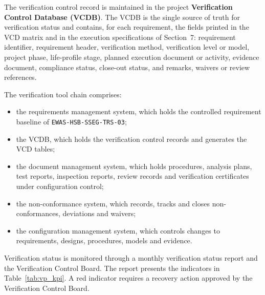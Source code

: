 The verification control record is maintained in the project \textbf{Verification Control Database (VCDB)}. The VCDB is the single source of truth for verification status and contains, for each requirement, the fields printed in the VCD matrix and in the execution specifications of Section~7: requirement identifier, requirement header, verification method, verification level or model, project phase, life-profile stage, planned execution document or activity, evidence document, compliance status, close-out status, and remarks, waivers or review references.

The verification tool chain comprises:
\begin{itemize}
    \item the requirements management system, which holds the controlled requirement baseline of \texttt{EWAS-HSB-SSEG-TRS-03};
    \item the VCDB, which holds the verification control records and generates the VCD tables;
    \item the document management system, which holds procedures, analysis plans, test reports, inspection reports, review records and verification certificates under configuration control;
    \item the non-conformance system, which records, tracks and closes non-conformances, deviations and waivers;
    \item the configuration management system, which controls changes to requirements, designs, procedures, models and evidence.
\end{itemize}

Verification status is monitored through a monthly verification status report and the Verification Control Board. The report presents the indicators in Table~\ref{tab:vp_kpi}. A red indicator requires a recovery action approved by the Verification Control Board.

